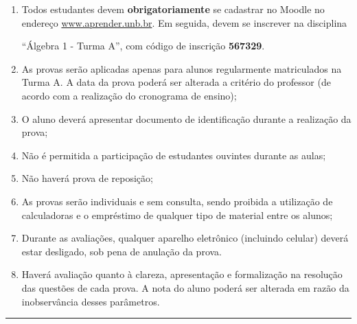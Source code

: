 \documentclass{article}
\begin{document}
\begin{enumerate}[label={\arabic*})]

\item Todos estudantes devem {\bf obrigatoriamente} se cadastrar no Moodle no endere{\c c}o
\url{www.aprender.unb.br}. Em seguida, devem se inscrever na disciplina
\begin{center}
``{\'A}lgebra 1 - Turma A'', com c{\'o}digo de inscri{\c c}{\~a}o {\bf 567329}.
\end{center}

\item As provas ser{\~a}o aplicadas apenas para alunos regularmente
  matriculados na Turma A. A data da prova poder{\'a} ser alterada a crit{\'e}rio do
  professor (de acordo com a realiza{\c c}{\~a}o do cronograma de ensino);
\vspace{-.25cm}

\item O aluno dever{\'a} apresentar documento de identifica{\c c}{\~a}o durante a
  realiza{\c c}{\~a}o da prova;
\vspace{-.25cm}

\item N{\~a}o {\'e} permitida a participa{\c c}{\~a}o de estudantes ouvintes durante as
  aulas;
\vspace{-.25cm}

\item N{\~a}o haver{\'a} prova de reposi{\c c}{\~a}o;
\vspace{-.25cm}

\item As provas ser{\~a}o individuais e sem consulta, sendo proibida a
  utiliza{\c c}{\~a}o de calculadoras e o empr{\'e}stimo de qualquer tipo de material
  entre os alunos;
\vspace{-.25cm}

\item Durante as avalia{\c c}{\~o}es, qualquer aparelho eletr{\^o}nico (incluindo
  celular) dever{\'a} estar desligado, sob pena de anula{\c c}{\~a}o da prova.
\vspace{-.25cm}

\item Haver{\'a} avalia{\c c}{\~a}o quanto {\`a} clareza, apresenta{\c c}{\~a}o e formaliza{\c c}{\~a}o na
  resolu{\c c}{\~a}o das quest{\~o}es de cada prova. A nota do aluno poder{\'a} ser alterada
  em raz{\~a}o da inobserv{\^a}ncia desses par{\^a}metros.

\end{enumerate}

\vfill
\hrule
\end{document}
